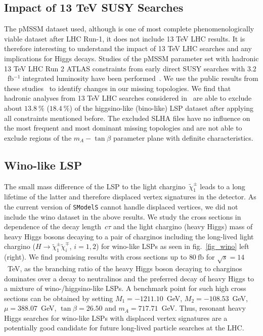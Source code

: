 \documentclass[11pt,a4paper]{article}
\begin{document}
\subsection*{Impact of 13 TeV SUSY Searches}
The pMSSM dataset used, although is one of most complete phenomenologically viable dataset after LHC Run-1, it does not include 13 TeV LHC results. It is therefore interesting to understand the impact of 13 TeV LHC searches and any implications for Higgs decays. Studies of the pMSSM parameter set with hadronic 13 TeV LHC Run 2 ATLAS constraints from early direct SUSY searches with $3.2$~fb$^{-1}$ integrated luminosity have been performed~\cite{Barr:2016inz, Barr:2016sho}. We use the public results from these studies~\cite{pmssm:barr} to identify changes in our missing topologies. We find that hadronic analyses from 13 TeV LHC searches considered in~\cite{Barr:2016inz, Barr:2016sho} are able to exclude about $13.8~\%$ ($18.4~\%$) of the higgsino-like (bino-like) LSP dataset after applying all constraints mentioned before. The excluded SLHA files have no influence on the most frequent and most dominant missing topologies and are not able to exclude regions of the $m_A-\tan\beta$ parameter plane with definite characteristics.

\subsection*{Wino-like LSP}
The small mass difference of the LSP to the light chargino~$\tilde{\chi}_1^\pm$ leads to a long lifetime of the latter and therefore displaced vertex signatures in the detector. As the current version of \texttt{SModelS} cannot handle displaced vertices, we did not include the wino dataset in the above results. We study the cross sections in dependence of the decay length~$c\tau$ and the light chargino (heavy Higgs) mass of heavy Higgs bosons decaying to a pair of charginos including the long-lived light chargino ($H\rightarrow \tilde{\chi}_1 ^\pm\tilde{\chi}_i ^\mp$, $i=1,2$) for wino-like LSPs as seen in fig.~\ref{fig_wino} left (right). We find promising results with cross sections up to $80~\text{fb}$ for $\sqrt{s}=14$~TeV, as the branching ratio of the heavy Higgs boson decaying to charginos dominates over a decay to neutralinos and the preferred decay of heavy Higgs to a mixture of wino-/higgsino-like LSPs. A benchmark point for such high cross sections can be obtained by setting $M_1 = -1211.10$~GeV, $M_2 = -108.53$~GeV, $\mu = 388.07$~GeV, $\tan\beta = 26.50$ and $m_A = 717.71$~GeV. Thus, resonant heavy Higgs searches for wino-like LSPs with displaced vertex signatures are a potentially good candidate for future long-lived particle searches at the LHC.
\end{document}
